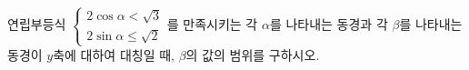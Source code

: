 연립부등식 $\begin{cases}2\cos\alpha<\sqrt{3}\\ 2\sin\alpha\le\sqrt{2}\end{cases}$를 만족시키는 각 $\alpha$를 나타내는 동경과 각 $\beta$를 나타내는 동경이 $y$축에 대하여 대칭일 때, $\beta$의 값의 범위를 구하시오. 
